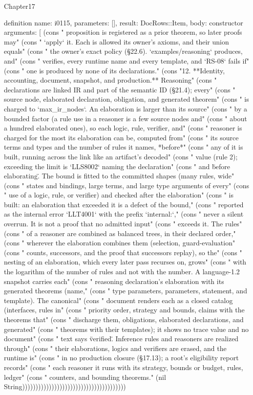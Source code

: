 \begin{lexlean}{Chapter17}
\begin{semanticmodule}
definition{
  name: i0115,
  parameters: [],
  result: DocRows::Item,
  body: constructor{
    arguments: [
      (cons "    proposition is registered as a prior theorem, so later proofs may" (cons "    `apply` it. Each is allowed its owner's axioms, and their union equals" (cons "    the owner's exact policy (§22.6). `examples/reasoning` produces, and" (cons "    verifies, every runtime name and every template, and `RS-08` fails if" (cons "    one is produced by none of its declarations." (cons "12. **Identity, accounting, document, snapshot, and production.** Reasoning" (cons "    declarations are linked IR and part of the semantic ID (§21.4); every" (cons "    source node, elaborated declaration, obligation, and generated theorem" (cons "    is charged to `max_ir_nodes`. An elaboration is larger than its source" (cons "    by a bounded factor (a rule use in a reasoner is a few source nodes and" (cons "    about a hundred elaborated ones), so each logic, rule, verifier, and" (cons "    reasoner is charged for the most its elaboration can be, computed from" (cons "    its source terms and types and the number of rules it names, *before*" (cons "    any of it is built, running across the link like an artifact's decoded" (cons "    value (rule 2); exceeding the limit is `LLS8002` naming the declaration" (cons "    and \"before elaborating\". The bound is fitted to the committed shapes (many rules, wide" (cons "    states and bindings, large terms, and large type arguments of every" (cons "    use of a logic, rule, or verifier) and checked after the elaboration" (cons "    is built: an elaboration that exceeded it is a defect of the bound," (cons "    reported as the internal error `LLT4001` with the prefix `internal:`," (cons "    never a silent overrun. It is not a proof that no admitted input" (cons "    exceeds it. The rules" (cons "    of a reasoner are combined as balanced trees, in their declared order," (cons "    wherever the elaboration combines them (selection, guard-evaluation" (cons "    counts, successors, and the proof that successors replay), so the" (cons "    nesting of an elaboration, which every later pass recurses on, grows" (cons "    with the logarithm of the number of rules and not with the number. A language-1.2 snapshot carries each" (cons "    reasoning declaration's elaboration with its generated theorems (name," (cons "    type parameters, parameters, statement, and template). The canonical" (cons "    document renders each as a closed catalog (interfaces, rules in" (cons "    priority order, strategy and bounds, claims with the theorems that" (cons "    discharge them, obligations, elaborated declarations, and generated" (cons "    theorems with their templates); it shows no trace value and no document" (cons "    text says \"verified\". Inference rules and reasoners are realized through" (cons "    their elaborations, logics and verifiers are erased, and the runtime is" (cons "    in no production closure (§17.13); a root's eligibility report records" (cons "    each reasoner it runs with its strategy, bounds or budget, rules, ledger" (cons "    counters, and bounding theorems." (nil String)))))))))))))))))))))))))))))))))))))))
}}
\end{semanticmodule}
\end{lexlean}
